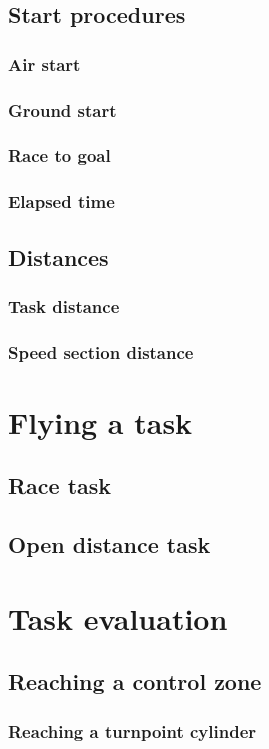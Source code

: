 \documentclass{article}
\begin{document}
\subsection{Start procedures}
\subsubsection{Air start}
\subsubsection{Ground start}
\subsubsection{Race to goal}
\subsubsection{Elapsed time}
\subsection{Distances}
\subsubsection{Task distance}
\subsubsection{Speed section distance}

\newpage
\section{Flying a task}
\subsection{Race task}
\subsection{Open distance task}

\newpage
\section{Task evaluation}
\subsection{Reaching a control zone}
\subsubsection{Reaching a turnpoint cylinder}
\end{document}
